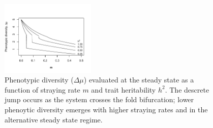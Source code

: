 \documentclass[twocolumn,preprintnumbers,amsmath,amssymb,superscriptaddress]{revtex4}
\begin{document}
\begin{figure}
  \captionsetup{justification=raggedright,
singlelinecheck=false
}
\centering
\includegraphics[width=0.4\textwidth]{figs/fig_traitdiff.pdf}
\caption{
Phenotypic diversity ($\Delta \mu$) evaluated at the steady state as a function of straying rate $m$ and trait heritability $h^2$. The descrete jump occurs as the system crosses the fold bifurcation; lower phenoytic diversity emerges with higher straying rates and in the alternative steady state regime. 
} \label{fig:traitdiff}
\end{figure}

 
\end{document}
